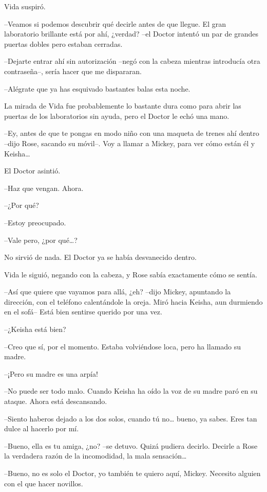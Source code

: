 {Vida suspiró.}

{--Veamos si podemos descubrir qué decirle antes de que llegue. El gran
 laboratorio brillante está por ahí, ¿verdad? --el Doctor intentó un par
de grandes puertas dobles pero estaban cerradas.}

{--Dejarte entrar ahí sin autorización --negó con la cabeza mientras
introducía otra contraseña--, sería hacer que me dispararan.}

{--Alégrate que ya has esquivado bastantes balas esta noche.}

{La mirada de Vida fue probablemente lo bastante dura como para abrir
 las puertas de los laboratorios sin ayuda, pero el Doctor le echó una
mano.}

{--Ey, antes de que te pongas en modo niño con una maqueta de trenes ahí
 dentro --dijo Rose, sacando su móvil--. Voy a llamar a Mickey, para ver
 cómo están él y Keisha\ldots{}}

{El Doctor asintió.}

{--Haz que vengan. Ahora.}

{--¿Por qué?}

{--Estoy preocupado.}

{--Vale pero, ¿por qué\ldots{}?}

{No sirvió de nada. El Doctor ya se había desvanecido dentro.}

{Vida le siguió, negando con la cabeza, y Rose sabía exactamente cómo se
sentía.}

\mbox{}

{--Así que quiere que vayamos para allá, ¿eh? --dijo Mickey, apuntando
 la dirección, con el teléfono calentándole la oreja. Miró hacia Keisha,
aun durmiendo en el sofá-- Está bien sentirse querido por una vez.}

{--¿Keisha está bien?}

{--Creo que sí, por el momento. Estaba volviéndose loca, pero ha llamado
su madre.}

{--¡Pero su madre es una arpía!}

{--No puede ser todo malo. Cuando Keisha ha oído la voz de su madre paró
en su ataque. Ahora está descansando.}

{--Siento haberos dejado a los dos solos, cuando tú no\ldots{} bueno, ya
sabes. Eres tan dulce al hacerlo por mí.}

{--Bueno, ella es tu amiga, ¿no? --se detuvo. Quizá pudiera decirlo.
 Decirle a Rose la verdadera razón de la incomodidad, la mala
 sensación\ldots{}}

{--Bueno, no es solo el Doctor, yo también te quiero aquí, Mickey.
Necesito alguien con el que hacer novillos.}

